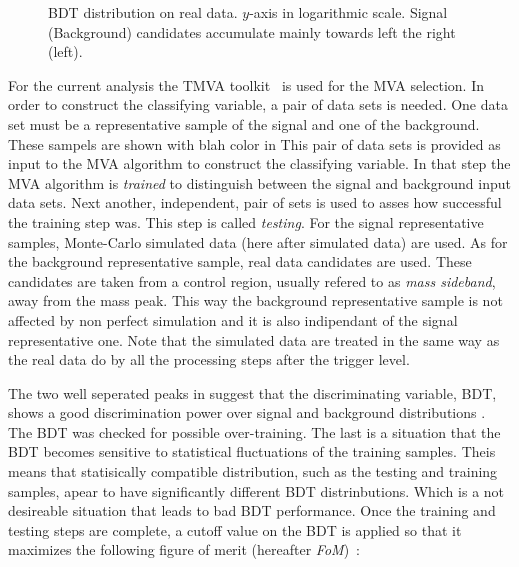 \begin{figure}[!h]
\begin{center}
  \scalebox{1}{}
  \caption{BDT distribution on real data. $y$-axis in logarithmic scale. Signal (Background) candidates accumulate mainly towards left the right (left). }
  \label{BTDG_performance}
\end{center}
\end{figure}

For the current analysis the TMVA toolkit~\cite{TMVA} is used for the MVA selection. In order to construct the classifying variable,
a pair of data sets is needed. One data set must be a representative sample of the signal and one of the background. {\color{red} These sampels are shown with blah color in }
This pair of data sets is provided as input to the MVA algorithm to construct the classifying variable.
In that step the MVA algorithm is {\it trained} to distinguish between the signal
and background input data sets. Next another, independent, pair of sets is used to asses how successful the training step was. This step is called {\it testing}.
For the signal representative samples, \BsJpsiKst Monte-Carlo simulated data (here after simulated data)
are used. As for the background representative sample, real data candidates are used. These candidates are taken from a control
region, usually refered to as {\it mass sideband}, away from the \BsJpsiKst mass peak. This way the background representative sample
is not affected by non perfect simulation and it is also indipendant of the signal representative one.
Note that the simulated data are treated in the same way as the real data do by all the processing steps after the \lone trigger level.

The two well seperated peaks in  suggest that the discriminating variable, BDT, shows a good discrimination
power over signal and background distributions .
The BDT was checked for possible over-training. The last is a situation that the BDT becomes sensitive to statistical fluctuations
of the training samples. Theis means that statisically compatible distribution, such as the testing and training samples,
apear to have significantly different BDT distrinbutions. Which is a not desireable situation that leads to bad BDT performance.
Once the training and testing steps are complete, a cutoff value on the BDT is applied so that it maximizes the following figure of merit
(hereafter {\it FoM})~\cite{Yuehong_fom}:

